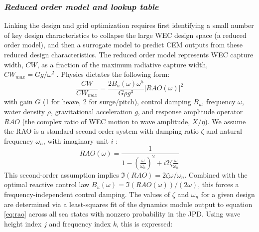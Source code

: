 \documentclass[10pt,twoside]{article}
\begin{document}
\subsubsection{\textit{Reduced order model and lookup table}}
Linking the design and grid optimization requires first identifying a small number of key design characteristics to collapse the large WEC design space (a reduced order model), and then a surrogate model to predict CEM outputs from these reduced design characteristics.
The reduced order model represents WEC capture width, $CW$, as a fraction of the maximum radiative capture width, $CW_{max}=Gg/\omega^2$ \cite{zou_practical_2023}. Physics dictates the following form:
\begin{equation}
    \label{eq:CW-fraction}
    \frac{CW}{CW_{max}} = \frac{2 B_u(\omega) \omega^5}{G \rho g^3} |RAO(\omega)|^2
\end{equation}
with gain $G$ (1 for heave, 2 for surge/pitch), control damping $B_u$, frequency $\omega$, water density $\rho$, gravitational acceleration $g$, and response amplitude operator $RAO$ (the complex ratio of WEC motion to wave amplitude, $X/\eta$).
We assume the RAO is a standard second order system with damping ratio $\zeta$ and natural frequency $\omega_n$, with imaginary unit $i$ \cite{franklin2014feedback}:
\begin{equation}
    \label{eq:rao}
    RAO(\omega) = \frac{1}{1-\left(\frac{\omega}{\omega_n}\right)^2 + i 2 \zeta \frac{\omega}{\omega_n}}
\end{equation}
This second-order assumption implies $\Im(RAO)=2\zeta\omega/\omega_n$.
Combined with the optimal reactive control law $B_u(\omega) = \Im(RAO(\omega))/(2\omega)$, this forces a frequency-independent control damping.
The values of $\zeta$ and $\omega_n$ for a given design are determined via a least-squares fit of the dynamics module output to equation \eqref{eq:rao} across all sea states with nonzero probability in the JPD.
Using wave height index $j$ and frequency index $k$, this is expressed:
\end{document}
